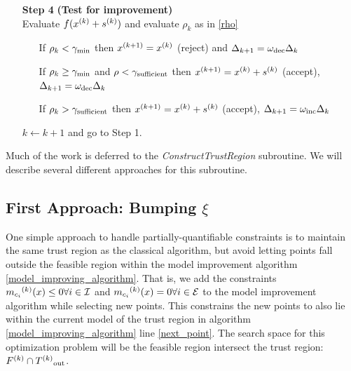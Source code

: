 \begin{algorithm}[H]
\begin{itemize}
        \item[\textbf{Step 4}] \textbf{(Test for improvement)} \\
            Evaluate $f({x}^{(k)} + {s}^{(k)})$ and evaluate $\rho_k$ as in \cref{rho} \begin{itemize}
                \item[] If $\rho_k < \gamma_{\text{min}}$ then ${x}^{(k+1)}={x}^{(k)}$ (reject) and $\Delta_{k+1} = \omega_{\text{dec}}\Delta_{k}$
                \item[] If $\rho_k \ge \gamma_{\text{min}}$ and $\rho < \gamma_{\text{sufficient}}$ then ${x}^{(k+1)}={x}^{(k)}+{s}^{(k)}$ (accept), $\Delta_{k+1} = \omega_{\text{dec}}\Delta_{k}$
                \item[] If $\rho_k > \gamma_{\text{sufficient}}$ then ${x}^{(k+1)}={x}^{(k)}+{s}^{(k)}$ (accept), $\Delta_{k+1} = \omega_{\text{inc}}\Delta_{k}$
            \end{itemize}
            $k \gets k+1$ and go to Step 1.
    \end{itemize}
\end{algorithm}

 

Much of the work is deferred to the \emph{ConstructTrustRegion} subroutine.
We will describe several different approaches for this subroutine.



\subsection{First Approach: Bumping $\xi$}
One simple approach to handle partially-quantifiable constraints is to maintain the same trust region as the classical algorithm, but avoid letting points fall outside the feasible region within the model improvement algorithm \cref{model_improving_algorithm}.
That is, we add the constraints ${{m}_{c_i}}^{(k)}(x) \le 0 \forall i \in \mathcal{I}$ and ${{m}_{c_i}}^{(k)}(x) = 0 \forall i \in \mathcal{E}$ to the model improvement algorithm while selecting new points.
This constrains the new points to also lie within the current model of the trust region in algorithm \cref{model_improving_algorithm} line \cref{next_point}.
The search space for this optimization problem will be the feasible region intersect the trust region: ${F}^{(k)} \cap {T^{(k)}}_{\text{out}} $.

